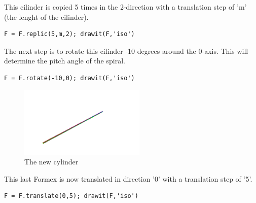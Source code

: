 {This cilinder is copied 5 times in the 2-direction with a translation step of 
'm' (the lenght of the cilinder). 
\begin{verbatim}
F = F.replic(5,m,2); drawit(F,'iso')
\end{verbatim}

The next step is to rotate this cilinder -10 degrees around the 0-axis. 
This will determine the pitch angle of the spiral.
\begin{verbatim}
F = F.rotate(-10,0); drawit(F,'iso')
\end{verbatim}
\begin{figure}[h]
  \centering
  \begin{makeimage}
  \end{makeimage}
  \begin{latexonly}
    \includegraphics[width=6cm]{images/spiral-006}
  \end{latexonly}
  \begin{htmlonly}
  \end{htmlonly}  
  \caption{The new cylinder}
\end{figure}

This last Formex is now translated in direction '0' with a translation step of '5'. 
\begin{verbatim}
F = F.translate(0,5); drawit(F,'iso')
\end{verbatim}

}
